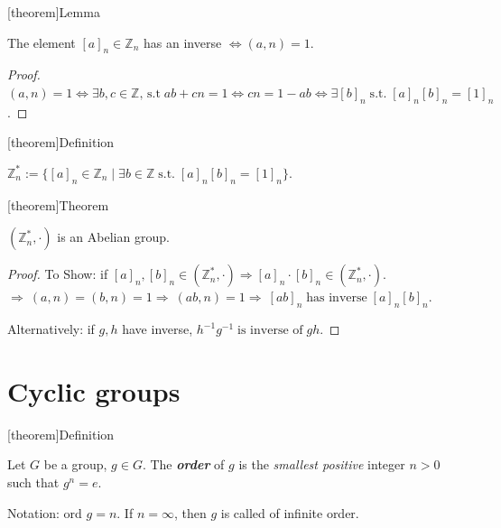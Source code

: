 \documentclass[12pt]{report}
\theoremstyle{definition}
\begin{document}
[theorem]{Lemma}
\begin{equivalence class inverse}
    The element ${[a]}_{n} \in \mathbb{Z}_n$ has an inverse $\iff (a, n) = 1$.
\end{equivalence class inverse}

\begin{proof}
    $(a, n) = 1 \iff \exists b, c \in \mathbb{Z}, \,\text{s.t}\; ab + cn = 1
    \iff cn = 1 - ab \iff \exists {[b]}_{n} \;\text{s.t.}\;
    {[a]}_{n}{[b]}_{n} = {[1]}_{n}$.
\end{proof}

[theorem]{Definition}
\begin{invertible equivalence class}
    $\mathbb{Z}_n^{*} := \{ {[a]}_{n} \in \mathbb{Z}_n \;|\; \exists b \in \mathbb{Z}
    \;\text{s.t.}\; {[a]}_{n}{[b]}_{n} = {[1]}_{n}\}$.
\end{invertible equivalence class}

[theorem]{Theorem}
\begin{special equivalence class is Abelian}
    $(\mathbb{Z}_n^{*}, \cdot)$ is an Abelian group.
\end{special equivalence class is Abelian}

\begin{proof}
    To Show: if ${[a]}_{n}, {[b]}_{n} \in (\mathbb{Z}_n^{*}, \cdot) 
    \Rightarrow {[a]}_{n} \cdot {[b]}_{n} \in (\mathbb{Z}_n^{*}, \cdot)$.
    \\$\Rightarrow\ (a, n) = (b, n) = 1 \Rightarrow\ (ab, n) = 1
    \Rightarrow\ {[ab]}_{n} \;\text{has inverse}\; {[a]}_{n} {[b]}_{n}$.

    Alternatively: if $g, h$ have inverse, $h^{-1}g^{-1} \;\text{is inverse of}\; gh$.
\end{proof}

\section{Cyclic groups}

[theorem]{Definition}
\begin{cyclic groups}
    Let $G$ be a group, $g \in G$. The \textbf{\emph{order}} of $g$ is the \emph{smallest positive} integer $n > 0$ %
    such that $g^{n} = e$.

    Notation: ord $g = n$. If $n = \infty$, then $g$ is called of infinite order.
\end{cyclic groups}
\end{document}
